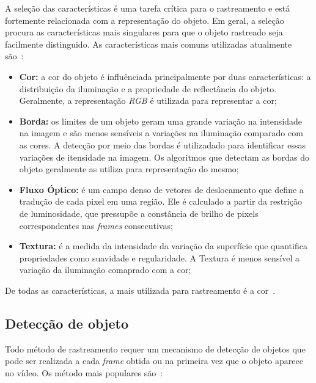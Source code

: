 	A seleção das características é uma tarefa crítica para o rastreamento e está fortemente relacionada com a representação do objeto. Em geral, a seleção procura as características mais singulares para que o objeto rastreado seja facilmente distinguido. As características mais comuns utilizadas atualmente são~\cite{yilmaz}:

	\begin{itemize}
		\item \textbf{Cor:} a cor do objeto é influênciada principalmente por duas características: a distribuição da iluminação e a propriedade de reflectância do objeto. Geralmente, a representação \textit{RGB} é utilizada para representar a cor;

		\item \textbf{Borda:} os limites de um objeto geram uma grande variação na intensidade na imagem e são menos sensíveis a variações na iluminação comparado com as cores. A detecção por meio das bordas é utilizadado para identificar essas variações de itensidade na imagem. Os algoritmos que detectam as bordas do objeto geralmente as utiliza para representação do mesmo;

		\item \textbf{Fluxo Óptico:} é um campo denso de vetores de deslocamento que define a tradução de cada pixel em uma região. Ele é calculado a partir da restrição de luminosidade, que pressupõe a constância de brilho de pixels correspondentes nas \textit{frames} consecutivas;

		\item \textbf{Textura:} é a medida da intensidade da variação da superfície que quantifica propriedades como suavidade e regularidade. A Textura é menos sensível a variação da iluminação comaprado com a cor;

	\end{itemize}

De todas as características, a mais utilizada para rastreamento é a cor~\cite{yilmaz}.

\subsection{Detecção de objeto}

	Todo método de rastreamento requer um mecanismo de detecção de objetos que pode ser realizada a cada \textit{frame} obtida ou na primeira vez que o objeto aparece no vídeo. Os método mais populares são~\cite{yilmaz}:


